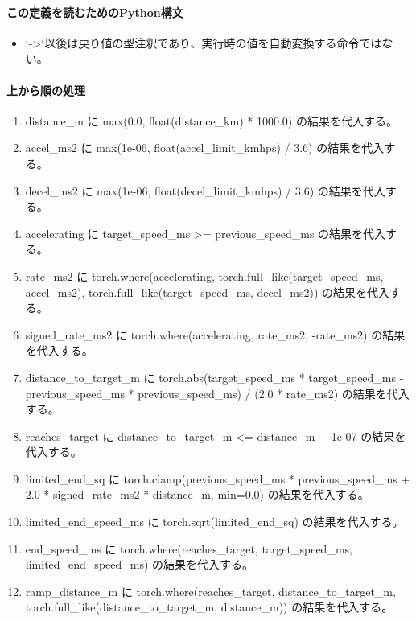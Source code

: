 \documentclass[a4paper,11pt]{article}
\begin{document}
            \paragraph{この定義を読むためのPython構文}
            \begin{itemize}[leftmargin=1.6em]
            \item `->`以後は戻り値の型注釈であり、実行時の値を自動変換する命令ではない。
            \end{itemize}
            \paragraph{上から順の処理}
            \begin{enumerate}[leftmargin=1.8em]
            \item distance\_m に max(0.0, float(distance\_km) * 1000.0) の結果を代入する。
\item accel\_ms2 に max(1e-06, float(accel\_limit\_kmhps) / 3.6) の結果を代入する。
\item decel\_ms2 に max(1e-06, float(decel\_limit\_kmhps) / 3.6) の結果を代入する。
\item accelerating に target\_speed\_ms >= previous\_speed\_ms の結果を代入する。
\item rate\_ms2 に torch.where(accelerating, torch.full\_like(target\_speed\_ms, accel\_ms2), torch.full\_like(target\_speed\_ms, decel\_ms2)) の結果を代入する。
\item signed\_rate\_ms2 に torch.where(accelerating, rate\_ms2, -rate\_ms2) の結果を代入する。
\item distance\_to\_target\_m に torch.abs(target\_speed\_ms * target\_speed\_ms - previous\_speed\_ms * previous\_speed\_ms) / (2.0 * rate\_ms2) の結果を代入する。
\item reaches\_target に distance\_to\_target\_m <= distance\_m + 1e-07 の結果を代入する。
\item limited\_end\_sq に torch.clamp(previous\_speed\_ms * previous\_speed\_ms + 2.0 * signed\_rate\_ms2 * distance\_m, min=0.0) の結果を代入する。
\item limited\_end\_speed\_ms に torch.sqrt(limited\_end\_sq) の結果を代入する。
\item end\_speed\_ms に torch.where(reaches\_target, target\_speed\_ms, limited\_end\_speed\_ms) の結果を代入する。
\item ramp\_distance\_m に torch.where(reaches\_target, distance\_to\_target\_m, torch.full\_like(distance\_to\_target\_m, distance\_m)) の結果を代入する。

\end{enumerate}
\end{document}
